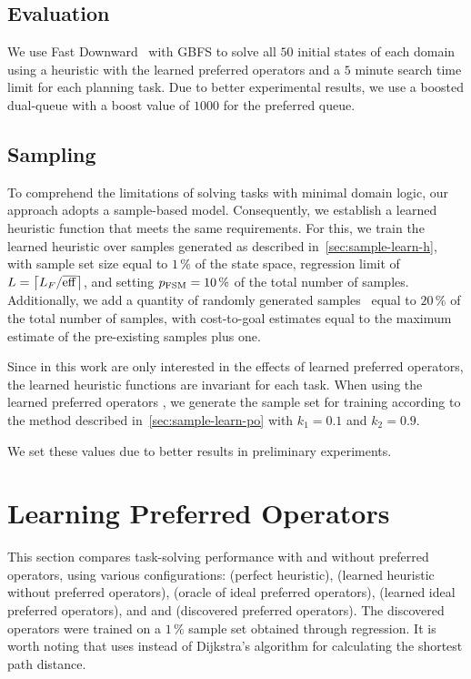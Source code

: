 \documentclass[ppgc,diss,english]{iiufrgs}
\providecommand{\ceil}[1]{\ensuremath{\left\lceil #1\right\rceil}}
\begin{document}
\subsection{Evaluation}
\label{sec:exp-evaluation}
We use Fast Downward~\cite{Helmert/2006} with GBFS to solve all $50$ initial states of each domain using a heuristic with the learned preferred operators and a $5$ minute search time limit for each planning task. Due to better experimental results, we use a boosted dual-queue with a boost value of $1000$ for the preferred queue.

\subsection{Sampling}
\label{sec:exp-sampling}
To comprehend the limitations of solving tasks with minimal domain logic, our approach adopts a sample-based model. Consequently, we establish a learned heuristic function that meets the same requirements.
For this, we train the learned heuristic \hnn over samples generated as described in~\cref{sec:sample-learn-h}, with sample set size equal to $1\,\%$ of the state space, regression limit of $L=\ceil{\facts/\overline{\eff}}$, and setting $p_{\text{FSM}}=10\,\%$ of the total number of samples. Additionally, we add a quantity of randomly generated samples~\cite{OToole/2022} equal to $20\,\%$ of the total number of samples, with cost-to-goal estimates equal to the maximum estimate of the pre-existing samples plus one.

Since in this work are only interested in the effects of learned preferred operators, the learned heuristic functions are invariant for each task. When using the learned preferred operators \pog, we generate the sample set for training according to the method described in~\cref{sec:sample-learn-po} with $k_1 = 0.1$ and $k_2 = 0.9$.

We set these values due to better results in preliminary experiments.

\section{Learning Preferred Operators}
\label{sec:exp-learning-po}
This section compares task-solving performance with and without preferred operators, using various configurations: \hstar (perfect heuristic), \hnn (learned heuristic without preferred operators), \postartable (oracle of ideal preferred operators), \postar (learned ideal preferred operators), and \pogstar and \pog (discovered preferred operators). The discovered operators were trained on a $1\,\%$ sample set obtained through regression. It is worth noting that \pogstar uses \hstar instead of Dijkstra's algorithm for calculating the shortest path distance.
\end{document}
